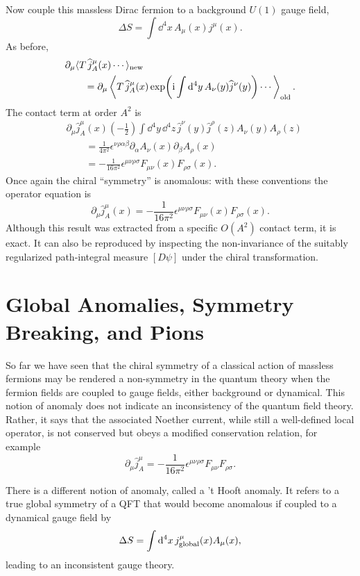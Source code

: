 Now couple this massless Dirac fermion to a background \(U(1)\) gauge
field,
\[
  \Delta S=\int\dd^4x\,A_\mu(x)j^\mu(x).
\]
As before,
\[
\begin{aligned}
  &\partial_\mu
  \langle T\,\widehat j_A^\mu(x)\cdots\rangle_{\rm new}
\\
  &\qquad =
  \partial_\mu
  \left\langle
    T\,\widehat j_A^\mu(x)
    \exp\!\left(\mathrm{i}\int\mathrm{d}^4y\,A_\nu(y)\widehat j^\nu(y)\right)
    \cdots
  \right\rangle_{\rm old}.
\end{aligned}
\]
The contact term at order \(A^2\) is
\[
\begin{aligned}
  &\partial_\mu\widehat j_A^\mu(x)
  \left(-\frac12\right)
  \int\dd^4y\,\dd^4z\,
  \widehat j^\nu(y)\widehat j^\rho(z)A_\nu(y)A_\rho(z)
\\
  &\qquad =
  \frac1{4\pi^2}
  \epsilon^{\nu\rho\alpha\beta}
  \partial_\alpha A_\nu(x)\partial_\beta A_\rho(x)
\\
  &\qquad =
  -\frac1{16\pi^2}
  \epsilon^{\mu\nu\rho\sigma}F_{\mu\nu}(x)F_{\rho\sigma}(x).
\end{aligned}
\]
Once again the chiral ``symmetry'' is anomalous: with these conventions
the operator equation is
\[
  \partial_\mu\widehat j_A^\mu(x)
  =
  -\frac1{16\pi^2}
  \epsilon^{\mu\nu\rho\sigma}F_{\mu\nu}(x)F_{\rho\sigma}(x).
\]
Although this result was extracted from a specific \(O(A^2)\) contact
term, it is exact.  It can also be reproduced by inspecting the
non-invariance of the suitably regularized path-integral measure
\([D\psi]\) under the chiral transformation.

\section{Global Anomalies, Symmetry Breaking, and Pions}

So far we have seen that the chiral symmetry of a classical action of
massless fermions may be rendered a non-symmetry in the quantum theory
when the fermion fields are coupled to gauge fields, either background or
dynamical.  This notion of anomaly does not indicate an inconsistency of
the quantum field theory.  Rather, it says that the associated Noether
current, while still a well-defined local operator, is not conserved but
obeys a modified conservation relation, for example
\[
  \partial_\mu \widehat j_A^\mu
  =
  -\frac1{16\pi^2}
  \epsilon^{\mu\nu\rho\sigma}F_{\mu\nu}F_{\rho\sigma}.
\]

There is a different notion of anomaly, called a 't Hooft anomaly.
It refers to a true global symmetry of a QFT that would become anomalous
if coupled to a dynamical gauge field by
\[
  \Delta S=\int\mathrm{d}^4x\,j^\mu_{\rm global}(x)A_\mu(x),
\]
leading to an inconsistent gauge theory.

